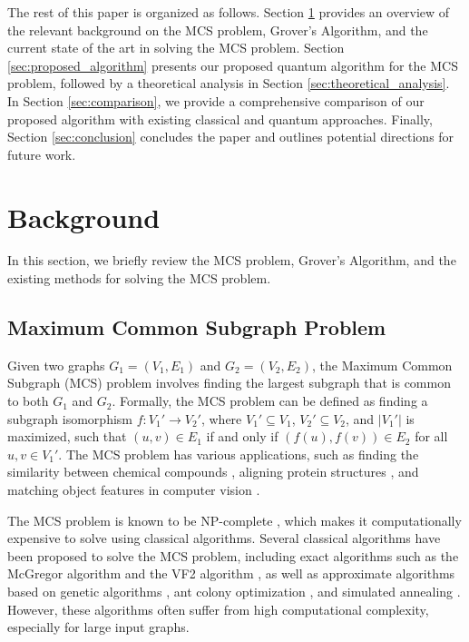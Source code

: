 The rest of this paper is organized as follows. Section \ref{sec:background} provides an overview of the relevant background on the MCS problem, Grover's Algorithm, and the current state of the art in solving the MCS problem. Section \ref{sec:proposed_algorithm} presents our proposed quantum algorithm for the MCS problem, followed by a theoretical analysis in Section \ref{sec:theoretical_analysis}. In Section \ref{sec:comparison}, we provide a comprehensive comparison of our proposed algorithm with existing classical and quantum approaches. Finally, Section \ref{sec:conclusion} concludes the paper and outlines potential directions for future work.

\section{Background} \label{sec:background}

In this section, we briefly review the MCS problem, Grover's Algorithm, and the existing methods for solving the MCS problem.

\subsection{Maximum Common Subgraph Problem}

Given two graphs $G_1 = (V_1, E_1)$ and $G_2 = (V_2, E_2)$, the Maximum Common Subgraph (MCS) problem involves finding the largest subgraph that is common to both $G_1$ and $G_2$. Formally, the MCS problem can be defined as finding a subgraph isomorphism $f: V_1' \rightarrow V_2'$, where $V_1' \subseteq V_1$, $V_2' \subseteq V_2$, and $|V_1'|$ is maximized, such that $(u, v) \in E_1$ if and only if $(f(u), f(v)) \in E_2$ for all $u, v \in V_1'$. The MCS problem has various applications, such as finding the similarity between chemical compounds \cite{raymond2002maximum}, aligning protein structures \cite{pinter2005alignment}, and matching object features in computer vision \cite{conte2004thirty}.

The MCS problem is known to be NP-complete \cite{garey1979computers}, which makes it computationally expensive to solve using classical algorithms. Several classical algorithms have been proposed to solve the MCS problem, including exact algorithms such as the McGregor algorithm \cite{mcgregor1982backtrack} and the VF2 algorithm \cite{cordella2004subgraph}, as well as approximate algorithms based on genetic algorithms \cite{mckinnon1999maximum}, ant colony optimization \cite{dorigo1999ant}, and simulated annealing \cite{kirkpatrick1983optimization}. However, these algorithms often suffer from high computational complexity, especially for large input graphs.

